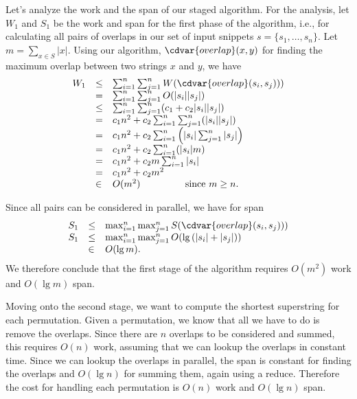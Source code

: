 \begin{gram}
%
Let's analyze the work and the span of our staged algorithm.
%
For the analysis, let $W_1$ and $S_1$ be the work and span for the
first phase of the algorithm, i.e., for calculating all pairs of
overlaps in our set of input snippets $s = \{s_1, \ldots, s_n \}$.
%
Let $m = \sum_{x \in S} |x|$.
%
Using our algorithm, $\cdvar{overlap}(x,y)$ for finding the maximum overlap
between two strings $x$ and $y$, we have
\[
\begin{array}{lll}
W_{1} & \leq & \sum_{i=1}^{n}\sum_{j=1}^{n} W(\cdvar{overlap}(s_i,s_j)))\\
  & = & \sum_{i=1}^{n}\sum_{j=1}^{n} O(|s_i| |s_j|)\\
  & \leq & \sum_{i=1}^{n}\sum_{j=1}^{n} (c_1 + c_2 |s_i| |s_j|)\\
  & =    & c_1 n^2 + c_2 \sum_{i=1}^{n}\sum_{j=1}^{n} (|s_i| |s_j|)\\
  & =    & c_1 n^2 + c_2 \sum_{i=1}^{n} \left(|s_i| \sum_{j=1}^{n} |s_j|\right)\\
  & =    & c_1 n^2 + c_2 \sum_{i=1}^{n} (|s_i| m) \\
  & =    & c_1 n^2 + c_2 m \sum_{i=1}^{n} |s_i| \\
  & =    & c_1 n^2 + c_2 m^2\\
  & \in  & O(m^2)  ~~~~~~~~~~~~~~\mbox{since } m \geq n.
\end{array}
\]

Since all pairs can be considered in parallel, we have for span
\[
\begin{array}{lll}
S_{1} & \leq & \max_{i=1}^{n}\max_{j=1}^{n} S(\cdvar{overlap}(s_i,s_j)))
\\
S_{1} & \leq & \max_{i=1}^{n}\max_{j=1}^{n} O(\lg{(|s_i| + |s_j|)})
\\
     & \in  & O(\lg m).
\end{array}
\]
%
We therefore conclude that the first stage of the algorithm requires
$O(m^2)$ work and $O(\lg{m})$ span.

Moving onto the second stage, we want to compute the shortest
superstring for each permutation.
%
Given a permutation, we know that all we have to do is remove the
overlaps.
%
Since there are $n$ overlaps to be considered and summed, this
requires $O(n)$ work, assuming that we can lookup the overlaps in
constant time.
%
Since we can lookup the overlaps in parallel, the span is constant for
finding the overlaps and $O(\lg{n})$ for summing them, again using a reduce.
%
Therefore the cost for handling each permutation is $O(n)$ work and
$O(\lg{n})$ span.
%



\end{gram}
